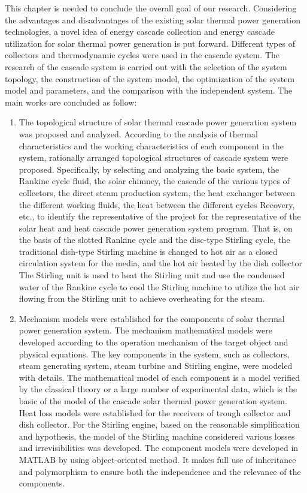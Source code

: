 %
This chapter is needed to conclude the overall goal of our research. Considering the advantages and disadvantages of the existing solar thermal power generation technologies, a novel idea of energy cascade collection and energy cascade utilization for solar thermal power generation is put forward. Different types of collectors and thermodynamic cycles were used in the cascade system. The research of the cascade system is carried out with the selection of the system topology, the construction of the system model, the optimization of the system model and parameters, and the comparison with the independent system. The main works are concluded as follow:
\begin{enumerate}
  \item The topological structure of solar thermal cascade power generation system was proposed and analyzed. According to the analysis of thermal characteristics and the working characteristics of each component in the system, rationally arranged topological structures of cascade system were proposed. Specifically, by selecting and analyzing the basic system, the Rankine cycle fluid, the solar chimney, the cascade of the various types of collectors, the direct steam production system, the heat exchanger between the different working fluids, the heat between the different cycles Recovery, etc., to identify the representative of the project for the representative of the solar heat and heat cascade power generation system program. That is, on the basis of the slotted Rankine cycle and the disc-type Stirling cycle, the traditional dish-type Stirling machine is changed to hot air as a closed circulation system for the media, and the hot air heated by the dish collector The Stirling unit is used to heat the Stirling unit and use the condensed water of the Rankine cycle to cool the Stirling machine to utilize the hot air flowing from the Stirling unit to achieve overheating for the steam.
  \item Mechanism models were established for the components of solar thermal power generation system. The mechanism mathematical models were developed according to the operation mechanism of the target object and physical equations. The key components in the system, such as collectors, steam generating system, steam turbine and Stirling engine, were modeled with details. The mathematical model of each component is a model verified by the classical theory or a large number of experimental data, which is the basic of the model of the cascade solar thermal power generation system. Heat loss models were established for the receivers of trough collector and dish collector. For the Stirling engine, based on the reasonable simplification and hypothesis, the model of the Stirling machine considered various losses and irrevisibilities was developed. The component models were developed in MATLAB by using object-oriented method. It makes full use of inheritance and polymorphism to ensure both the independence and the relevance of the components.

\end{enumerate}
